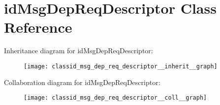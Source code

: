 \hypertarget{classid_msg_dep_req_descriptor}{}\section{id\+Msg\+Dep\+Req\+Descriptor Class Reference}
\label{classid_msg_dep_req_descriptor}


Inheritance diagram for id\+Msg\+Dep\+Req\+Descriptor\+:
\nopagebreak
\begin{figure}[H]
\begin{center}
\leavevmode
\texttt{[image: classid\_msg\_dep\_req\_descriptor\_\_inherit\_\_graph]}
\end{center}
\end{figure}


Collaboration diagram for id\+Msg\+Dep\+Req\+Descriptor\+:
\nopagebreak
\begin{figure}[H]
\begin{center}
\leavevmode
\texttt{[image: classid\_msg\_dep\_req\_descriptor\_\_coll\_\_graph]}
\end{center}
\end{figure}
